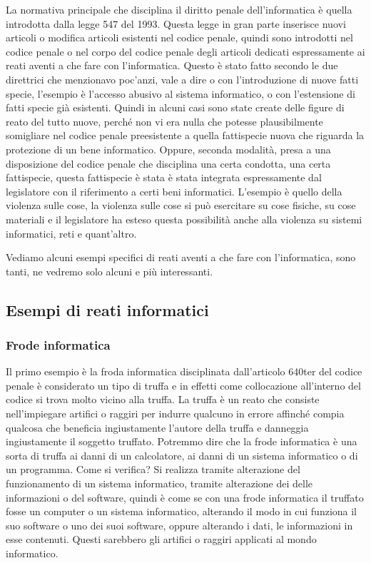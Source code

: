 La normativa principale che disciplina il diritto penale dell'informatica è quella introdotta dalla legge 547 del 1993. Questa legge in gran parte inserisce nuovi articoli o modifica articoli esistenti nel codice penale, quindi sono introdotti nel codice penale o nel corpo del codice penale degli articoli dedicati espressamente ai reati aventi a che fare con l'informatica. Questo è stato fatto secondo le due direttrici che menzionavo poc'anzi, vale a dire o con l'introduzione di nuove fatti specie, l'esempio è l'accesso abusivo al sistema informatico, o con l'estensione di fatti specie già esistenti. Quindi in alcuni casi sono state create delle figure di reato del tutto nuove, perché non vi era nulla che potesse plausibilmente somigliare nel codice penale preesistente a quella fattispecie nuova che riguarda la protezione di un bene informatico. 
Oppure, seconda modalità, presa a una disposizione del codice penale che disciplina una certa condotta, una certa fattispecie, questa fattispecie è stata è stata integrata espressamente dal legislatore con il riferimento a certi beni informatici. L'esempio è quello della violenza sulle cose, la violenza sulle cose si può esercitare su cose fisiche, su cose materiali e il legislatore ha esteso questa possibilità anche alla violenza su sistemi informatici, reti e quant'altro. 

Vediamo alcuni esempi specifici di reati aventi a che fare con l'informatica, sono tanti, ne vedremo solo alcuni e più interessanti. 

\subsection{Esempi di reati informatici}
\subsubsection{Frode informatica}
Il primo esempio è la froda informatica disciplinata dall'articolo 640ter del codice penale è considerato un tipo di truffa e in effetti come collocazione all'interno del codice si trova molto vicino alla truffa. La truffa è un reato che consiste nell'impiegare artifici o raggiri per indurre qualcuno in errore affinché compia qualcosa che beneficia ingiustamente l'autore della truffa e danneggia ingiustamente il soggetto truffato. Potremmo dire che la frode informatica è una sorta di truffa ai danni di un calcolatore, ai danni di un sistema informatico o di un programma. 
Come si verifica? Si realizza tramite alterazione del funzionamento di un sistema informatico, tramite alterazione dei delle informazioni o del software, quindi è come se con una frode informatica il truffato fosse un computer o un sistema informatico, alterando il modo in cui funziona il suo software o uno dei suoi software, oppure alterando i dati, le informazioni in esse contenuti. Questi sarebbero gli artifici o raggiri applicati al mondo informatico. 

